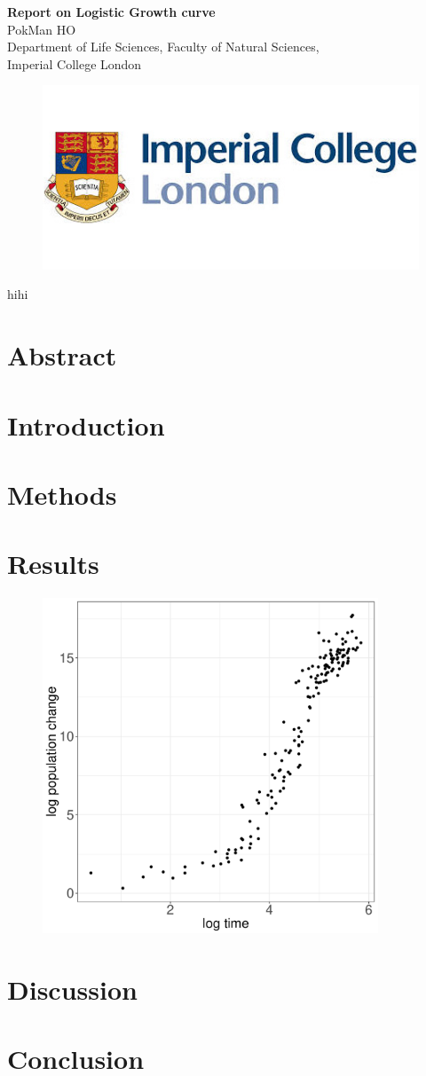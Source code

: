 \documentclass[a4paper, 11pt]{article}
\title{\ReportTitle}
\author{\ReportAuthor (CID: 01786076)}
\date{}
\newcommand{\ReportTitle}{Report on Logistic Growth curve} %
\newcommand{\ReportAuthor}{PokMan HO}
\newcommand{\ReportAffil}{Department of Life Sciences, Faculty of Natural Sciences,\\Imperial College London}
\begin{document}
	\begin{center}
		\Huge\textbf{\ReportTitle}\\
		\LARGE\ReportAuthor\\
		\Large\ReportAffil
	\end{center}
	\begin{figure}[h]
		\centering\includegraphics[width=\linewidth]{icl.jpg}
	\end{figure}
	\clearpage
	
	\maketitle
	hihi\autocite{zwietering1994modeling}
	\section*{Abstract}
	\section*{Introduction}
	\section*{Methods}
	\section*{Results}
	\begin{figure}[h]
		\centering\includegraphics[width=10cm]{Log_data.pdf}
	\end{figure}
	\section*{Discussion}
	\section*{Conclusion}
	\nocite{*}\printbibliography
\end{document}

